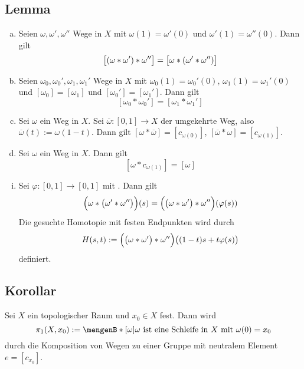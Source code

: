 \subsection{Lemma} %
\label{sub:98}
\begin{enumerate}[a)]
	\item Seien $\omega, \omega', \omega''$ Wege in $X$ mit $\omega(1)= \omega'(0)$ und $\omega'(1)= \omega''(0)$. Dann gilt 
	\[
		\benbrace[\big]{(\omega * \omega') * \omega''} =  \benbrace[\big]{\omega * ( \omega' * \omega'')}
	\]
	\item Seien $\omega_0, \omega_0', \omega_1, \omega_1'$ Wege in $X$ mit $\omega_0(1)= \omega_0'(0)$, $\omega_1(1)= \omega_1'(0)$ und 
	$[\omega_0] = [\omega_1]$ und $[\omega_0'] = [\omega_1']$. Dann gilt
	\[
		[\omega_0 * \omega_0'] = [\omega_1 * \omega_1']
	\]
	\item Sei $\omega$ ein Weg in $X$. Sei $\overline{\omega} : [0,1] \to X $ der umgekehrte Weg, also $\overline{\omega} (t) := \omega(1-t)$. Dann gilt 
	$[\omega * \overline{\omega}] = [c_{\omega(0)}]$, $[\overline{\omega} * \omega ] = [c_{\omega(1)}]$.
	\item Sei $\omega$ ein Weg in $X$. Dann gilt 
	\[
		[\omega * c_{\omega(1)}] = [\omega]
	\]
\end{enumerate}
\begin{enumerate}[(i)]
	\item Sei $\varphi : [0,1] \to [0,1]$ mit .
	Dann gilt 
	\begin{align*}
		\enbrace[\Big]{\omega * \enbrace[\big]{\omega' * \omega''} }(s) = \enbrace[\Big]{\enbrace[\big]{\omega * \omega'} * \omega''} (\varphi(s))  
	\end{align*}
	Die gesuchte Homotopie mit festen Endpunkten wird durch
	\[
		H(s,t) := \enbrace[\Big]{ \enbrace[\big]{\omega * \omega'} * \omega'' } \enbrace[\big]{(1-t)s + t \varphi(s)}  
	\]
	definiert. \bewende
\end{enumerate}

\subsection[Korollar: Gruppenstruktur auf der Menge der Homotopieklassen von Schleifen]{Korollar} %
\label{sub:99}
Sei $X$ ein topologischer Raum und $x_0 \in X$ fest. Dann wird 
\[
	\pi_1 (X, x_0) := \set[{[\omega]}]{\omega \text{ ist eine Schleife in }X \text{ mit } \omega(0)= x_0} 
\]
durch die Komposition von Wegen zu einer Gruppe mit neutralem Element $e= [c_{x_0}]$.

